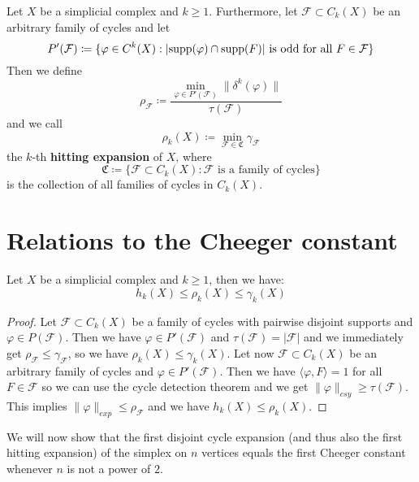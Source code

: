 \begin{defi}\label{definition412}
Let \(X\) be a simplicial complex and \(k\geq 1\). Furthermore, let \(\mathcal{F}\subset C_k(X)\) be an arbitrary family of cycles and let
\[
P'(\mathcal{F})\coloneqq\{\varphi\in C^k(X):|\mathrm{supp}(\varphi)\cap\mathrm{supp}(F)|\text{ is odd for all }F\in\mathcal{F}\}
\]
Then we define
\[
\rho_{\mathcal{F}}\coloneqq\frac{\min\limits_{\varphi\in P'(\mathcal{F})}\|\delta^k(\varphi)\|}{\tau(\mathcal{F})}
\]
and we call
\[
\rho_k(X)\coloneqq\min\limits_{\mathcal{F}\in\mathfrak{C}}\gamma_{\mathcal{F}}
\]
the \(k\)-th \textbf{hitting expansion} of \(X\), where
\[
\mathfrak{C}\coloneqq\{\mathcal{F}\subset C_k(X):\mathcal{F}\text{ is a family of cycles}\}
\]
is the collection of all families of cycles in \(C_k(X)\).
\end{defi}

\section{Relations to the Cheeger constant}

\begin{prop}\label{proposition411}
Let \(X\) be a simplicial complex and \(k\geq 1\), then we have:
\[
h_k(X)\leq\rho_k(X)\leq\gamma_k(X)
\]
\begin{proof}
Let \(\mathcal{F}\subset C_k(X)\) be a family of cycles with pairwise disjoint supports and \(\varphi\in P(\mathcal{F})\). Then we have \(\varphi\in P'(\mathcal{F})\) and \(\tau(\mathcal{F})=|\mathcal{F}|\) and we immediately get \(\rho_{\mathcal{F}}\leq\gamma_{\mathcal{F}}\), so we have \(\rho_k(X)\leq\gamma_k(X)\). Let now \(\mathcal{F}\subset C_k(X)\) be an arbitrary family of cycles and \(\varphi\in P'(\mathcal{F})\). Then we have \(\langle\varphi,F\rangle=1\) for all \(F\in\mathcal{F}\) so we can use the cycle detection theorem and we get \(\|\varphi\|_{csy}\geq\tau(\mathcal{F})\). This implies \(\|\varphi\|_{exp}\leq\rho_{\mathcal{F}}\) and we have \(h_k(X)\leq\rho_k(X)\).
\end{proof}
\end{prop}

We will now show that the first disjoint cycle expansion (and thus also the first hitting expansion) of the simplex on \(n\) vertices equals the first Cheeger constant whenever \(n\) is not a power of \(2\).

